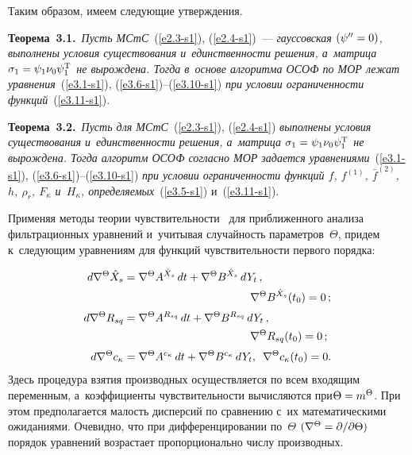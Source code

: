 \begin{multicols}{2}
Таким образом, имеем следующие утверждения.

\smallskip

\noindent
\textbf{Теорема~3.1.}\
\textit{Пусть МСтС}~(\ref{e2.3-s1}), (\ref{e2.4-s1})~--- 
\textit{гауссовская $(\psi'' \hm=0)$, выполнены условия существования 
и~единственности решения, а~мат\-ри\-ца $\si_1 \hm= 
\psi_1 \nu_0 \psi_1^{\mathrm{T}}$ не вырождена. Тогда в~основе алгоритма 
ОСОФ по МОР лежат уравнения}~(\ref{e3.1-s1}), 
(\ref{e3.6-s1})--(\ref{e3.10-s1}) \textit{при условии ограниченности 
функций}~(\ref{e3.11-s1}).

\smallskip

\textbf{Теорема~3.2.}\
\textit{Пусть для МСтС}~(\ref{e2.3-s1}), (\ref{e2.4-s1}) 
\textit{выполнены условия существования и~единственности решения, 
а~мат\-ри\-ца $\si_1\hm=\psi_1\nu_0\psi_1^{\mathrm{T}}$ не вырождена. 
Тогда алгоритм ОСОФ согласно МОР задается уравнениями}~(\ref{e3.1-s1}), 
(\ref{e3.6-s1})--(\ref{e3.10-s1}) 
\textit{при условии ограниченности функций $f$, $f^{(1)}$, $\bar f^{(2)}$, 
$h$, $\rho_r$, $F_\kappa$ и~$H_\kappa$, 
определяемых}~(\ref{e3.5-s1}) и~(\ref{e3.11-s1}).


\smallskip

Применяя методы теории чувствительности~\cite{9-s1, 10-s1} 
для приближенного анализа фильтрационных уравнений и~учитывая 
случайность параметров~$\Theta$, придем к~следующим уравнениям 
для функций чувствительности первого порядка:

\noindent
\begin{align*}
d\nabla^\Theta \hat X_s &= \nabla^\Theta A^{\hat X_s} \,dt + \nabla^\Theta B^{\hat X_s}\,dY_t\,,\\ 
&\hspace*{40mm}\nabla^\Theta B^{\hat X_s}(t_0) =0\,;\\[2pt]
d\nabla^\Theta R_{sq} &= \nabla^\Theta A^{R_{sq}}\, dt + \nabla^\Theta B^{R_{sq}}\,dY_t\,, \\
&\hspace*{40mm}\nabla^\Theta R_{sq}(t_0) =0\,;\\[2pt]
d\nabla^\Theta c_{\kappa} &= \nabla^\Theta A^{c_\kappa}\, dt + \nabla^\Theta 
B^{c_\kappa}\,dY_t,\enskip  \nabla^\Theta c_\kappa(t_0) =0.
\end{align*}
Здесь процедура взятия производных осущест\-вляется по всем входящим переменным, 
а~коэффициенты чувствительности вычисляются при\linebreak  $\Theta\hm=m^\Theta$. При 
этом предполагается малость дисперсий по сравнению с~их математическими 
ожиданиями. Очевидно, что при дифференцировании по~$\Theta$ 
$(\nabla^\Theta \hm= \prt /\prt\Theta)$
порядок уравнений возрастает пропорционально числу производных. 


\end{multicols}
